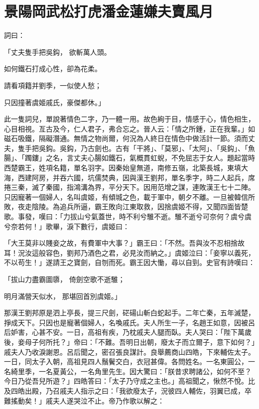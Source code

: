 %

\chapter{景陽岡武松打虎\KG 潘金蓮嫌夫賣風月}

詞曰：

「丈夫隻手把吳鈎，
欲斬萬人頭。

如何鐵石打成心性，卻為花柔。

請看項籍并劉季，一似使人愁；

只因撞著虞姬戚氏，豪傑都休。」

此一隻詞兒，單說著情色二字，乃一體一用。故色絢于目，情感于心，情色相生，心目相視。亙古及今，仁人君子，弗合忘之。晉人云：「情之所鍾，正在我輩。」如磁石吸鐵，隔礙潛通。無情之物尚爾，何況為人終日在情色中做活計一節。須而丈夫，隻手把吳鈎。吳鈎，乃古劍也。古有「干將」、「莫邪」、「太阿」、「吳鈎」、「魚腸」、「躅鏤」之名，言丈夫心腸如鐵石，氣概貫虹蜺，不免屈志于女人。題起當時西楚霸王，姓項名籍，單名羽字。因秦始皇無道，南修五嶺，北築長城，東填大海，西建阿房，并吞六國，坑儒焚典，因與漢王劉邦，單名季字，時二人起兵，席捲三秦，滅了秦國，指鴻溝為界，平分天下。因用范增之謀，連敗漢王七十二陣。只因寵著一個婦人，名叫虞姬，有傾城之色，載于軍中，朝夕不離。一旦被韓信所敗，夜走陰陵。為追兵所逼，霸王敗向江東取救，因捨虞姬不得，又聞四面皆楚歌。事發，嘆曰：「力拔山兮氣蓋世，時不利兮騅不逝。騅不逝兮可奈何？虞兮虞兮奈若何！」歌畢，淚下數行，虞姬曰：

「大王莫非以賤妾之故，有費軍中大事？」霸王曰：「不然。吾與汝不忍相捨故耳！況汝這般容色，劉邦乃酒色之君，必見汝而納之。」虞姬泣曰：「妾寧以義死，不以苟生！」遂請王之寶劍，自刎而死。霸王因大慟，尋以自剄。史官有詩嘆曰：

「拔山力盡霸圖隳，  倚劍空歌不逝騅；

明月滿營天似水，  那堪回首別虞姬。」

那漢王劉邦原是泗上亭長，提三尺劍，硭碭山斬白蛇起手。二年亡秦，五年滅楚，掙成天下。只因也是寵著個婦人，名喚戚氏。夫人所生一子，名趙王如意，因被呂后妒害，心甚不安。一日，高祖有疾，乃枕戚夫人腿而臥。夫人哭曰：「陛下萬歲後，妾母子何所托？」帝曰：「不難。吾明日出朝，廢太子而立爾子，意下如何？」戚夫人乃收淚謝恩。呂后聞之，密召張良謀計。良舉薦商山四皓，下來輔佐太子。一日，同太子入朝，高祖見四人鬚鬢交白，衣冠甚偉。各問姓名。一名東圓公，一名綺里季，一名夏黃公，一名角里先生。因大驚曰：「朕昔求聘諸公，如何不至？今日乃從吾兒所遊？」四皓答曰：「太子乃守成之主也。」高祖聞之，愀然不悅。比及四皓出殿，乃召戚夫人指示之曰：「我欲廢太子，況彼四人輔佐，羽翼已成，卒難搖動矣！」戚夫人遂哭泣不止。帝乃作歌以解之：

